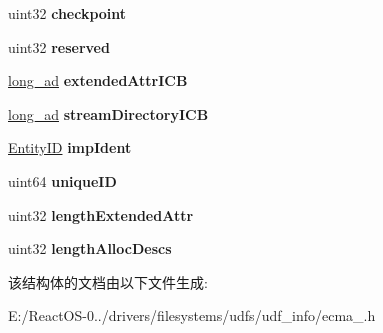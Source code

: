 \begin{DoxyCompactItemize}
\item 
\mbox{\label{struct___e_x_t_e_n_d_e_d___f_i_l_e___e_n_t_r_y_a17a670f94cc000120a8f34d86c9f44bb}} 
uint32 {\bfseries checkpoint}
\item 
\mbox{\label{struct___e_x_t_e_n_d_e_d___f_i_l_e___e_n_t_r_y_aeda3ebba9d96509954e181a5e57cb731}} 
uint32 {\bfseries reserved}
\item 
\mbox{\label{struct___e_x_t_e_n_d_e_d___f_i_l_e___e_n_t_r_y_a4d2516cac7852444ca3c106c6ad07161}} 
\hyperlink{structlong__ad}{long\+\_\+ad} {\bfseries extended\+Attr\+I\+CB}
\item 
\mbox{\label{struct___e_x_t_e_n_d_e_d___f_i_l_e___e_n_t_r_y_a8d948086f78930f273cbd3e6962f25c5}} 
\hyperlink{structlong__ad}{long\+\_\+ad} {\bfseries stream\+Directory\+I\+CB}
\item 
\mbox{\label{struct___e_x_t_e_n_d_e_d___f_i_l_e___e_n_t_r_y_ab23a9a3250843e9eac5e3401e080f0f2}} 
\hyperlink{struct_entity_i_d}{Entity\+ID} {\bfseries imp\+Ident}
\item 
\mbox{\label{struct___e_x_t_e_n_d_e_d___f_i_l_e___e_n_t_r_y_a2ec989eb5c27ab6894a54bb2d2be4587}} 
uint64 {\bfseries unique\+ID}
\item 
\mbox{\label{struct___e_x_t_e_n_d_e_d___f_i_l_e___e_n_t_r_y_a6ad054398eadf3d7bc966c2c20b02e30}} 
uint32 {\bfseries length\+Extended\+Attr}
\item 
\mbox{\label{struct___e_x_t_e_n_d_e_d___f_i_l_e___e_n_t_r_y_afe1cddddf755042d6193181de12e0bb8}} 
uint32 {\bfseries length\+Alloc\+Descs}
\end{DoxyCompactItemize}


该结构体的文档由以下文件生成\+:\begin{DoxyCompactItemize}
\item 
E\+:/\+React\+O\+S-\/0../drivers/filesystems/udfs/udf\+\_\+info/ecma\+\_.\+h\end{DoxyCompactItemize}
